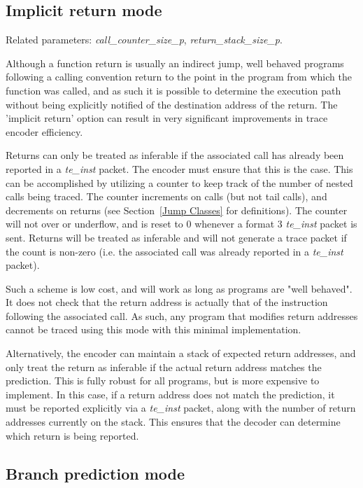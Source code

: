 \subsection{Implicit return mode} \label{sec:implicit-return}

Related parameters: \textit{call\_counter\_size\_p}, \textit{return\_stack\_size\_p}.

Although a function return is usually an indirect jump, well behaved programs following a 
calling convention return to the point in the program from which the function was called, 
and as such it is possible to determine the execution path without being explicitly notified 
of the destination address of the return.  The 'implicit return' option can result in very 
significant improvements in trace encoder efficiency.  

Returns can only be treated as inferable if the associated call has already been reported in 
a \textit{te\_inst} packet.  The encoder must ensure that this is the case.  This can be accomplished 
by utilizing a counter to keep track of the number of nested calls being traced.  The counter 
increments on calls (but not tail calls), and decrements on returns (see Section~\ref{Jump Classes} 
for definitions).  The counter will not over or underflow, and is reset to 0 whenever a format 3 
\textit{te\_inst} packet is sent.  Returns will be treated as inferable and will not generate a trace 
packet if the count is non-zero (i.e. the associated call was already reported in a \textit{te\_inst} packet).

Such a scheme is low cost, and will work as long as programs are "well behaved".  It does not check that the 
return address is actually that of the instruction following the associated call.  As such, any program that
modifies return addresses cannot be traced using this mode with this minimal implementation.

Alternatively, the encoder can maintain a stack of expected return addresses, and only treat the 
return as inferable if the actual return address matches the prediction.  This is fully robust for all
programs, but is more expensive to implement.  In this case, if a return address does not match the prediction, 
it must be reported explicitly via a \textit{te\_inst} packet, along with the number of return addresses 
currently on the stack.  This ensures that the decoder can determine which return is being reported. 

\subsection{Branch prediction mode} \label{sec:branch-prediction}

